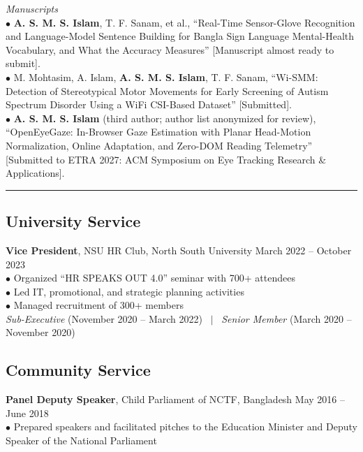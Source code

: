 \documentclass[11pt,a4paper]{article}
\renewcommand{\section}[1]{%
    \par\vspace{6pt}%
    \pagebreak[0]%
    \noindent{\large\bfseries\scshape #1}%
    \vspace{2pt}%
    \hrule%
    \vspace{6pt}%
    \nopagebreak[4]%
}
\begin{document}
\vspace{4pt}
\noindent\textit{Manuscripts}\\
$\bullet$ \textbf{A. S. M. S. Islam}, T. F. Sanam, et al., ``Real-Time Sensor-Glove Recognition and Language-Model Sentence Building for Bangla Sign Language Mental-Health Vocabulary, and What the Accuracy Measures'' [Manuscript almost ready to submit].\\
$\bullet$ M. Mohtasim, A. Islam, \textbf{A. S. M. S. Islam}, T. F. Sanam, ``Wi-SMM: Detection of Stereotypical Motor Movements for Early Screening of Autism Spectrum Disorder Using a WiFi CSI-Based Dataset'' [Submitted].\\
$\bullet$ \textbf{A. S. M. S. Islam} (third author; author list anonymized for review), ``OpenEyeGaze: In-Browser Gaze Estimation with Planar Head-Motion Normalization, Online Adaptation, and Zero-DOM Reading Telemetry'' [Submitted to ETRA 2027: ACM Symposium on Eye Tracking Research \& Applications].

\section{Service}

\subsection*{University Service}
\noindent\textbf{Vice President}, NSU HR Club, North South University \hfill March 2022 -- October 2023\\
$\bullet$ Organized ``HR SPEAKS OUT 4.0'' seminar with 700+ attendees\\
$\bullet$ Led IT, promotional, and strategic planning activities\\
$\bullet$ Managed recruitment of 300+ members\\
\textit{Sub-Executive} (November 2020 -- March 2022) ~$|$~ \textit{Senior Member} (March 2020 -- November 2020)

\subsection*{Community Service}
\noindent\textbf{Panel Deputy Speaker}, Child Parliament of NCTF, Bangladesh \hfill May 2016 -- June 2018\\
$\bullet$ Prepared speakers and facilitated pitches to the Education Minister and Deputy Speaker of the National Parliament
\end{document}
